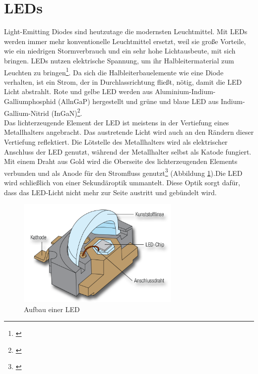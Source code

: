 \section{LEDs} \label{sec_led}
Light-Emitting Diodes sind heutzutage die modernsten Leuchtmittel. Mit LEDs werden immer mehr konventionelle Leuchtmittel ersetzt, weil sie große Vorteile, wie ein niedrigen Stormverbrauch und ein sehr hohe Lichtausbeute, mit sich bringen. LEDs nutzen elektrische Spannung, um ihr  Halbleitermaterial zum Leuchten zu bringen\footnote{\cite[150]{mueller}}. Da sich die Halbleiterbauelemente wie eine Diode verhalten, ist ein Strom, der in Durchlassrichtung fließt, nötig, damit die LED Licht abstrahlt. Rote und gelbe LED werden aus Aluminium-Indium-Galliumphosphid (AllnGaP) hergestellt und grüne und blaue LED aus Indium-Gallium-Nitrid (InGaN)\footnote{\cite[153]{ris}}.\\
Das lichterzeugende Element der LED ist meistens in der Vertiefung eines Metallhalters angebracht. Das austretende Licht wird auch an den Rändern dieser Vertiefung reflektiert. Die Lötstelle des Metallhalters wird als elektrischer Anschluss der LED genutzt, während der Metallhalter selbst als Katode fungiert. Mit einem Draht aus Gold wird die Oberseite des lichterzeugenden Elements verbunden und als Anode für den Stromfluss genutzt\footnote{\cite[154]{ris}} (Abbildung \ref{b_led}).Die LED wird schließlich von einer Sekundäroptik ummantelt. Diese Optik sorgt dafür, dass das LED-Licht nicht mehr zur Seite austritt und gebündelt wird.

\begin{figure}[H]     %
\centering
\includegraphics[width=0.7\textwidth]{bilder/led} 
\caption {Aufbau einer LED\protect\footnotemark}\label{b_led}
\end{figure}


